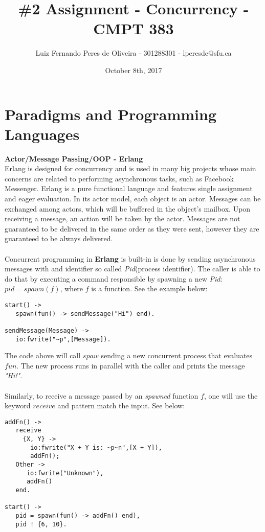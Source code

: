 \documentclass[conference]{IEEEtran}
\title{\#2 Assignment - Concurrency - CMPT 383}
\author{Luiz Fernando Peres de Oliveira - 301288301 - lperesde@sfu.ca}
\date{October 8th, 2017}
\begin{document}
\maketitle

\section{Paradigms and Programming Languages}

\textbf{ Actor/Message Passing/OOP - Erlang } \\
Erlang is designed for concurrency and is used in many big projects whose main concerns are related to performing asynchronous tasks, such as Facebook Messenger. Erlang is a pure functional language and features single assignment and eager evaluation. In its actor model, each object is an actor. Messages can be exchanged among actors, which will be buffered in the object's mailbox. Upon receiving a message, an action will be taken by the actor. Messages are not guaranteed to be delivered in the same order as they were sent, however they are guaranteed to be always delivered.
\\\\
Concurrent programming in \textbf{Erlang} is built-in is done by sending asynchronous messages with and identifier so called \textit{Pid}(process identifier). The caller is able to do that by executing a command responsible by spawning a new \textit{Pid}: $pid = spawn(f)$, where $f$ is a function. See the example below:
\lstset{language=erlang}
\begin{lstlisting}[frame=single]
start() ->
   spawn(fun() -> sendMessage("Hi") end). 

sendMessage(Message) ->
   io:fwrite("~p",[Message]).
\end{lstlisting}

The code above will call $spaw$ sending a new concurrent process that evaluates $fun$. The new process runs in parallel with the caller and prints the message \textit{"Hi!"}. 
\\\\
Similarly, to receive a message passed by an \textit{spawned} function $f$, one will use the keyword $receive$ and pattern match the input. See below: 
\begin{lstlisting}[frame=single]
addFn() ->
   receive 
     {X, Y} -> 
       io:fwrite("X + Y is: ~p~n",[X + Y]), 
       addFn(); 
   Other ->
      io:fwrite("Unknown"), 
      addFn() 
   end. 

start() ->
   pid = spawn(fun() -> addFn() end), 
   pid ! {6, 10}.
\end{lstlisting}
\end{document}

